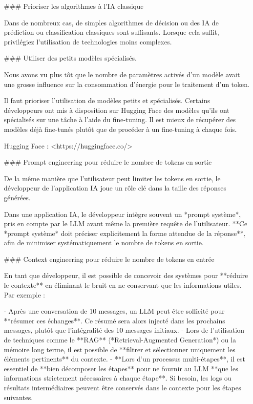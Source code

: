 {### Prioriser les algorithmes à l'IA classique

Dans de nombreux cas, de simples algorithmes de décision ou des IA de prédiction ou classification classiques sont suffisants.
Lorsque cela suffit, privilégiez l'utilisation de technologies moins complexes.

### Utiliser des petits modèles spécialisés.

Nous avons vu plus tôt que le nombre de paramètres activés d'un modèle avait une grosse influence sur la consommation d'énergie pour le traitement d'un token.

Il faut prioriser l'utilisation de modèles petits et spécialisés. Certains développeurs ont mis à disposition sur Hugging Face des modèles qu'ils ont spécialisés sur une tâche à l'aide du fine-tuning. Il est mieux de récupérer des modèles déjà fine-tunés plutôt que de procéder à un fine-tuning à chaque fois.

Hugging Face : <https://huggingface.co/>

### Prompt engineering pour réduire le nombre de tokens en sortie

De la même manière que l'utilisateur peut limiter les tokens en sortie, le développeur de l'application IA joue un rôle clé dans la taille des réponses générées.

Dans une application IA, le développeur intègre souvent un *prompt système*, pris en compte par le LLM avant même la première requête de l'utilisateur. **Ce *prompt système* doit préciser explicitement la forme attendue de la réponse**, afin de minimiser systématiquement le nombre de tokens en sortie.

### Context engineering pour réduire le nombre de tokens en entrée

En tant que développeur, il est possible de concevoir des systèmes pour **réduire le contexte** en éliminant le bruit en ne conservant que les informations utiles.
Par exemple :

- Après une conversation de 10 messages, un LLM peut être sollicité pour **résumer ces échanges**. Ce résumé sera alors injecté dans les prochains messages, plutôt que l'intégralité des 10 messages initiaux.
- Lors de l'utilisation de techniques comme le **RAG** (*Retrieval-Augmented Generation*) ou la mémoire long terme, il est possible de **filtrer et sélectionner uniquement les éléments pertinents** du contexte.
- **Lors d'un processus multi-étapes**, il est essentiel de **bien décomposer les étapes** pour ne fournir au LLM **que les informations strictement nécessaires à chaque étape**. Si besoin, les logs ou résultats intermédiaires peuvent être conservés dans le contexte pour les étapes suivantes.

}
